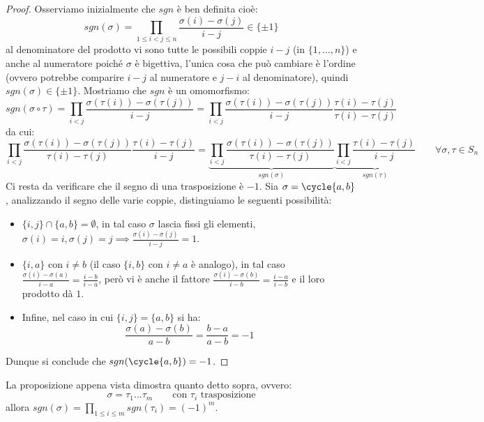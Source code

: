 \documentclass[11pt]{scrartcl}
\begin{document}
\begin{proof}
    Osserviamo inizialmente che $sgn$ è ben definita cioè:
        \[ sgn(\sigma) = \prod_{1 \leq i < j \leq n} \frac{\sigma(i) - \sigma(j)}{i - j} \in \{\pm 1\}
            \]
    al denominatore del prodotto vi sono tutte le possibili coppie $i - j$ (in $\{1,\ldots,n\}$) e anche al numeratore poiché $\sigma$ è bigettiva, l'unica cosa che 
    può cambiare è l'ordine (ovvero potrebbe comparire $i - j$ al numeratore e $j - i$ al denominatore), quindi $sgn(\sigma) \in \{\pm 1\}$. Mostriamo che $sgn$ 
    è un omomorfismo:
        \[ sgn(\sigma \circ \tau) = \prod_{i < j}\frac{\sigma(\tau(i)) - \sigma(\tau(j))}{i - j} =  \prod_{i < j}\frac{\sigma(\tau(i)) - \sigma(\tau(j))}{i - j}\frac{\tau(i) - \tau(j)}{\tau(i) - \tau(j)}
            \]
    da cui:
        \[ \prod_{i < j}\frac{\sigma(\tau(i)) - \sigma(\tau(j))}{\tau(i) - \tau(j)}\frac{\tau(i) - \tau(j)}{ i - j} =
        \underbrace{\prod_{i < j} \frac{\sigma(\tau(i)) - \sigma(\tau(j))}{\tau(i) - \tau(j)}}_{sgn(\sigma)} \underbrace{\prod_{i < j}\frac{\tau(i) - \tau(j)}{ i - j}}_{sgn(\tau)}
        \qquad \forall \sigma,\tau \in S_n
            \]
    Ci resta da verificare che il segno di una trasposizione è $-1$. Sia $\sigma = \cycle{a,b}$, analizzando il segno delle varie coppie, distinguiamo le seguenti possibilità:
    \begin{itemize}
        \item $\{i,j\} \cap \{a,b\} = \emptyset $, in tal caso $\sigma$ lascia fissi gli elementi, $\sigma(i) = i, \sigma(j) = j \implies \frac{\sigma(i) - \sigma(j)}{i - j} = 1$.
        \item $\{i,a\}$ con $i \ne b$ (il caso $\{i,b\}$ con $i \ne a$ è analogo), in tal caso $\frac{\sigma(i) - \sigma(a)}{i - a} = \frac{i - b}{i - a}$, 
            però vi è anche il fattore $\frac{\sigma(i) - \sigma(b)}{i - b} = \frac{i - a}{i - b}$ e il loro prodotto dà $1$.
        \item Infine, nel caso in cui $\{i,j\} = \{a,b\}$ si ha:
            \[ \frac{\sigma(a) - \sigma(b)}{a - b} = \frac{b - a}{a - b} = -1
                \]
    \end{itemize}
    Dunque si conclude che $sgn(\cycle{a,b}) = -1$.
\end{proof}

\begin{remark}
    La proposizione appena vista dimostra quanto detto sopra, ovvero:
        \[ \sigma = \tau_1 \ldots \tau_m \qquad \text{con $\tau_i$ trasposizione}
            \]
    allora $sgn(\sigma) = \prod_{1\leq i \leq m}sgn(\tau_i) = (-1)^m$.
\end{remark}
\end{document}
